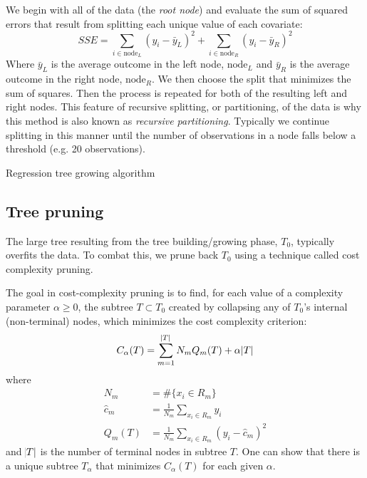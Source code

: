 \documentclass[12pt]{article}
\begin{document}
We begin with all of the data (the \emph{root node}) and evaluate the sum of squared errors that result from splitting each unique value of each covariate:
\begin{equation}
  SSE = \sum_{i \in \text{node}_{L}} (y_{i} - \bar{y}_{L})^2 + \sum_{i \in \text{node}_{R}} (y_{i} - \bar{y}_{R})^2 
\end{equation}
Where $\bar{y}_{L}$ is the average outcome in the left node, $\text{node}_{L}$ and $\bar{y}_{R}$ is the average outcome in the right node, $\text{node}_{R}$. We then choose the split that minimizes the sum of squares. Then the process is repeated for both of the resulting left and right nodes. This feature of recursive splitting, or partitioning, of the data is why this method is also known as \emph{recursive partitioning}. Typically we continue splitting in this manner until the number of observations in a node falls below a threshold (e.g. 20 observations).

\begin{algorithm}[H]
 \caption{Regression tree growing algorithm}
\end{algorithm}


\subsection{Tree pruning} %
\label{sub:tree_pruning}

The large tree resulting from the tree building/growing phase, $T_{0}$, typically overfits the data. To combat this, we prune back $T_{0}$ using a technique called cost complexity pruning. 

The goal in cost-complexity pruning is to find, for each value of a complexity parameter $\alpha \geq 0$, the subtree $T \subset T_{0}$ created by collapsing any of $T_{0}$'s internal (non-terminal) nodes, which minimizes the cost complexity criterion:
%
\begin{equation}
    C_{\alpha}(T) = \sum_{m = 1}^{\abs{T}} N_{m} Q_{m}(T) + \alpha \abs{T}
\end{equation}
where
%
\begin{align}
  N_{m} &= \# \{x_{i} \in R_{m}\} \\
  \hat{c}_{m} &= \frac{1}{N_{m}} \sum_{x_{i} \in R_{m}} y_{i} \\
  Q_{m}(T) &= \frac{1}{N_{m}} \sum_{x_{i} \in R_{m}} (y_{i} - \hat{c}_{m})^2
\end{align}
and $\abs{T}$ is the number of terminal nodes in subtree $T$. One can show that there is a unique subtree $T_{\alpha}$ that minimizes $C_{\alpha}(T)$ for each given $\alpha$.
\end{document}
